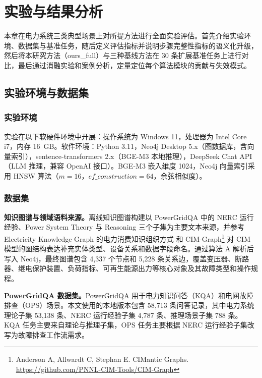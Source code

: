 \section{实验与结果分析}

本章在电力系统三类典型场景上对所提方法进行全面实验评估。首先介绍实验环境、数据集与基准任务，随后定义评估指标并说明步骤完整性指标的语义化升级，然后将本研究方法（ours\_full）与三种基线方法在 30 条扩展基准任务上进行对比，最后通过消融实验和案例分析，定量定位每个算法模块的贡献与失效模式。

\subsection{实验环境与数据集}

\subsubsection{实验环境}

实验在以下软硬件环境中开展：操作系统为 Windows 11，处理器为 Intel Core i7，内存 16~GB。软件环境：Python 3.11，Neo4j Desktop 5.x（图数据库，含向量索引），sentence-transformers 2.x（BGE-M3 本地推理），DeepSeek Chat API（LLM 推理，兼容 OpenAI 接口）。BGE-M3 嵌入维度 1024，Neo4j 向量索引采用 HNSW 算法（$m=16$，$ef\_construction=64$，余弦相似度）。

\subsubsection{数据集}

\textbf{知识图谱与领域语料来源。}离线知识图谱构建以 PowerGridQA 中的 NERC 运行经验、Power System Theory 与 Reasoning 三个子集为主要文本来源\cite{powergridqa2026}，并参考 Electricity Knowledge Graph 的电力消费知识组织方式\cite{hanzel2025electricitykg} 和 CIM-Graph\footnote{Anderson A, Allwardt C, Stephan E. CIMantic Graphs. \url{https://github.com/PNNL-CIM-Tools/CIM-Graph}} 对 CIM 模型的图结构表达补充实体类型、设备关系和数据字段命名。通过算法 A 解析后写入 Neo4j，最终图谱包含 4{,}337 个节点和 5{,}228 条关系边，覆盖变压器、断路器、继电保护装置、负荷指标、可再生能源出力等核心对象及其故障类型和操作规程。

\textbf{PowerGridQA 数据集。}PowerGridQA 用于电力知识问答（KQA）和电网故障排查（OPS）场景。本文使用的本地版本包含 58{,}713 条问答记录，其中电力系统理论子集 53{,}138 条、NERC 运行经验子集 4{,}787 条、推理场景子集 788 条。KQA 任务主要来自理论与推理子集，OPS 任务主要根据 NERC 运行经验子集改写为故障排查工作流需求。

